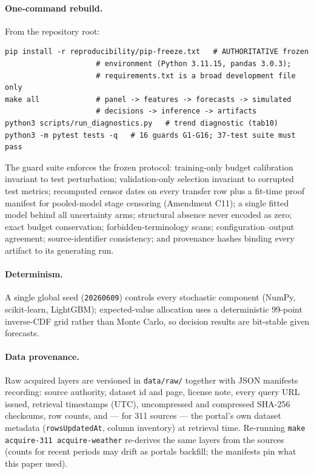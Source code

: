 \paragraph{One-command rebuild.} From the repository root:
\begin{verbatim}
pip install -r reproducibility/pip-freeze.txt   # AUTHORITATIVE frozen
                     # environment (Python 3.11.15, pandas 3.0.3);
                     # requirements.txt is a broad development file only
make all             # panel -> features -> forecasts -> simulated
                     # decisions -> inference -> artifacts
python3 scripts/run_diagnostics.py   # trend diagnostic (tab10)
python3 -m pytest tests -q   # 16 guards G1-G16; 37-test suite must pass
\end{verbatim}
The guard suite enforces the frozen protocol: training-only budget
calibration invariant to test perturbation; validation-only selection
invariant to corrupted test metrics; recomputed censor dates on every
transfer row plus a fit-time proof manifest for pooled-model stage
censoring (Amendment C11); a single fitted model behind all uncertainty
arms; structural absence never encoded as zero; exact budget
conservation; forbidden-terminology scans; configuration--output
agreement; source-identifier consistency; and provenance hashes binding
every artifact to its generating run.

\paragraph{Determinism.} A single global seed (\texttt{20260609}) controls
every stochastic component (NumPy, scikit-learn, LightGBM); expected-value
allocation uses a deterministic 99-point inverse-CDF grid rather than
Monte Carlo, so decision results are bit-stable given forecasts.

\paragraph{Data provenance.} Raw acquired layers are versioned in
\texttt{data/raw/} together with JSON manifests recording: source
authority, dataset id and page, license note, every query URL issued,
retrieval timestamps (UTC), uncompressed and compressed SHA-256
checksums, row counts, and --- for 311 sources --- the portal's own
dataset metadata (\texttt{rowsUpdatedAt}, column inventory) at retrieval
time. Re-running \texttt{make acquire-311 acquire-weather} re-derives
the same layers from the sources (counts for recent periods may drift as
portals backfill; the manifests pin what this paper used).

